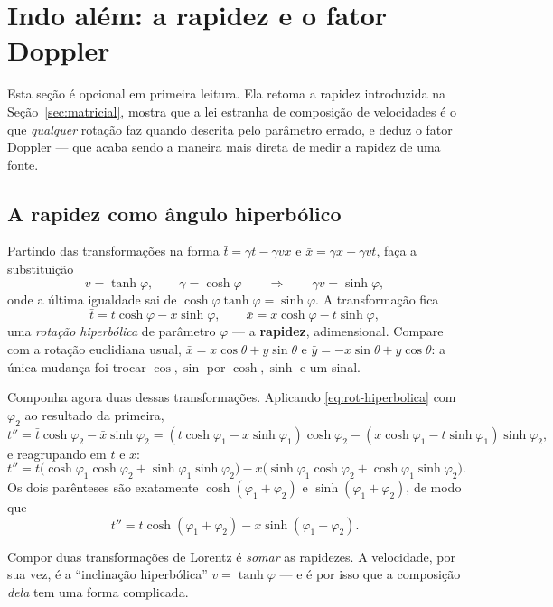 \documentclass[12pt,a4paper,oneside]{book}
\theoremstyle{rgplain}
\theoremstyle{rgremark}
\begin{document}
\section{Indo além: a rapidez e o fator Doppler}
\label{sec:indo-alem}

\begin{leitura}
Esta seção é opcional em primeira leitura. Ela retoma a rapidez introduzida na
Seção~\ref{sec:matricial}, mostra que a lei estranha de composição de
velocidades é o que \emph{qualquer} rotação faz quando descrita pelo parâmetro
errado, e deduz o fator Doppler --- que acaba sendo a maneira mais direta de
medir a rapidez de uma fonte.
\end{leitura}

\subsection*{A rapidez como ângulo hiperbólico}

Partindo das transformações na forma $\bar t=\gamma t-\gamma v x$ e
$\bar x=\gamma x-\gamma v t$, faça a substituição
\[
  v=\tanh\varphi,\qquad \gamma=\cosh\varphi
  \qquad\Longrightarrow\qquad \gamma v=\sinh\varphi,
\]
onde a última igualdade sai de $\cosh\varphi\tanh\varphi=\sinh\varphi$. A
transformação fica
\begin{equation}
  \bar t=t\cosh\varphi-x\sinh\varphi,\qquad
  \bar x=x\cosh\varphi-t\sinh\varphi,
  \label{eq:rot-hiperbolica}
\end{equation}
uma \emph{rotação hiperbólica} de parâmetro $\varphi$ --- a \textbf{rapidez},
adimensional. Compare com a rotação euclidiana usual,
$\bar x=x\cos\theta+y\sin\theta$ e $\bar y=-x\sin\theta+y\cos\theta$: a única mudança
foi trocar $\cos,\sin$ por $\cosh,\sinh$ e um sinal.

Componha agora duas dessas transformações. Aplicando
\eqref{eq:rot-hiperbolica} com $\varphi_2$ ao resultado da primeira,
\[
  t''=\bar t\cosh\varphi_2-\bar x\sinh\varphi_2
     =(t\cosh\varphi_1-x\sinh\varphi_1)\cosh\varphi_2
      -(x\cosh\varphi_1-t\sinh\varphi_1)\sinh\varphi_2,
\]
e reagrupando em $t$ e $x$:
\[
  t''=t\bigl(\cosh\varphi_1\cosh\varphi_2+\sinh\varphi_1\sinh\varphi_2\bigr)
      -x\bigl(\sinh\varphi_1\cosh\varphi_2+\cosh\varphi_1\sinh\varphi_2\bigr).
\]
Os dois parênteses são exatamente $\cosh(\varphi_1+\varphi_2)$ e
$\sinh(\varphi_1+\varphi_2)$, de modo que
\[
  t''=t\cosh(\varphi_1+\varphi_2)-x\sinh(\varphi_1+\varphi_2).
\]

\begin{central}
Compor duas transformações de Lorentz é \emph{somar} as rapidezes. A
velocidade, por sua vez, é a ``inclinação hiperbólica'' $v=\tanh\varphi$ --- e é
por isso que a composição \emph{dela} tem uma forma complicada.
\end{central}
\end{document}
